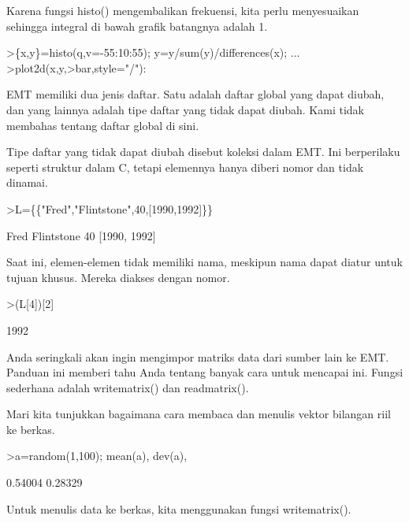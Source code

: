 \documentclass[a4paper,10pt]{article}
\begin{document}
\begin{eulernotebook}
\begin{eulercomment}
\begin{eulercomment}
\begin{eulercomment}
\begin{eulercomment}
\begin{eulercomment}
Karena fungsi histo() mengembalikan frekuensi, kita perlu menyesuaikan
sehingga integral di bawah grafik batangnya adalah 1.
\end{eulercomment}
\begin{eulerprompt}
>\{x,y\}=histo(q,v=-55:10:55); y=y/sum(y)/differences(x); ...
>plot2d(x,y,>bar,style="/"):
\end{eulerprompt}
\begin{eulercomment}
EMT memiliki dua jenis daftar. Satu adalah daftar global yang dapat
diubah, dan yang lainnya adalah tipe daftar yang tidak dapat diubah.
Kami tidak membahas tentang daftar global di sini.

Tipe daftar yang tidak dapat diubah disebut koleksi dalam EMT. Ini
berperilaku seperti struktur dalam C, tetapi elemennya hanya diberi
nomor dan tidak dinamai.
\end{eulercomment}
\begin{eulerprompt}
>L=\{\{"Fred","Flintstone",40,[1990,1992]\}\}
\end{eulerprompt}
\begin{euleroutput}
  Fred
  Flintstone
  40
  [1990,  1992]
\end{euleroutput}
\begin{eulercomment}
Saat ini, elemen-elemen tidak memiliki nama, meskipun nama dapat
diatur untuk tujuan khusus. Mereka diakses dengan nomor.
\end{eulercomment}
\begin{eulerprompt}
>(L[4])[2]
\end{eulerprompt}
\begin{euleroutput}
  1992
\end{euleroutput}
\begin{eulercomment}
\begin{eulercomment}
\begin{eulercomment}
Anda seringkali akan ingin mengimpor matriks data dari sumber lain ke
EMT. Panduan ini memberi tahu Anda tentang banyak cara untuk mencapai
ini. Fungsi sederhana adalah writematrix() dan readmatrix().

Mari kita tunjukkan bagaimana cara membaca dan menulis vektor bilangan
riil ke berkas.
\end{eulercomment}
\begin{eulerprompt}
>a=random(1,100); mean(a), dev(a),
\end{eulerprompt}
\begin{euleroutput}
  0.54004
  0.28329
\end{euleroutput}
\begin{eulercomment}
Untuk menulis data ke berkas, kita menggunakan fungsi writematrix().


\end{eulercomment}
\end{eulercomment}
\end{eulercomment}
\end{eulercomment}
\end{eulercomment}
\end{eulercomment}
\end{eulercomment}
\end{eulernotebook}
\end{document}
